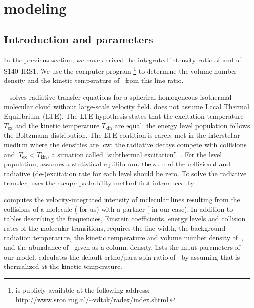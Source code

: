 \FloatBarrier
\section{\Radex{} modeling}



\subsection{Introduction and parameters}
In the previous section, we have derived the integrated intensity ratio of
 and  of S140~IRS1.
We use the computer program \radex{}%
\footnote{
    \Radex{} is publicly available at the following address:\\
    \url{http://www.sron.rug.nl/~vdtak/radex/index.shtml}.
}
to determine the volume number density and the kinetic temperature of~ from this line ratio.

\Radex{}~\parencite{vandertak2007radex} solves radiative transfer equations for a spherical homogeneous isothermal molecular cloud without large-scale velocity field.
\Radex{} does not assume Local Thermal Equilibrium~(LTE).
The LTE hypothesis states that the excitation temperature $T_\text{ex}$ and the kinetic temperature $T_\text{kin}$ are equal: the energy level population follows the Boltzmann distribution.
The LTE contition is rarely met in the interstellar medium where the densities are low:
the radiative decays compete with collisions and~$T_\text{ex}<T_\text{kin}$, a situation called ``subthermal excitation''~\parencite{vandertak2011radiative}.
For the level population, \radex{} assumes a statistical equilibrium: the sum of the collisional and radiative (de-)excitation rate for each level should be zero.
To solve the radiative transfer, \radex{} uses the escape-probability method first introduced by~\textcite{sobolev1960}.

\Radex{} computes the velocity-integrated intensity of molecular lines resulting from the collisions of a molecule ( for us) with a partner ( in our case).
In addition to tables describing the frequencies, Einstein coefficients, energy levels and collision rates of the molecular transitions, \radex{} requires the line width, the background radiation temperature, the kinetic temperature and volume number density of~, and the abundance of~ given as a column density.
 lists the input parameters of our model.
\Radex{} calculates the default ortho/para spin ratio of~ by assuming that  is thermalized at the kinetic temperature.

